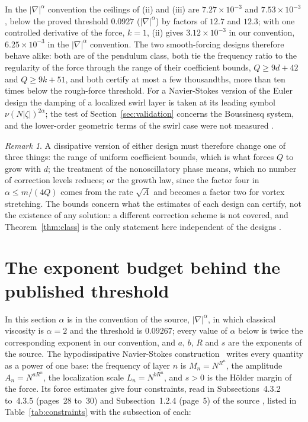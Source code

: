 \documentclass[11pt]{article}
\theoremstyle{remark}
\newtheorem{remark}[theorem]{Remark}
\newcommand{\ev}[1]{\hspace{0.2em}{\small\textsf{[#1]}}}
\begin{document}
In the $|\nabla|^{\alpha}$ convention the ceilings of (ii) and (iii) are $7.27\times10^{-3}$ and
$7.53\times10^{-3}$, below the proved threshold $0.0927$ ($|\nabla|^{\alpha}$)
by factors of $12.7$ and $12.3$; with one controlled derivative of the force, $k=1$, (ii) gives
$3.12\times10^{-3}$ in our convention, $6.25\times10^{-3}$ in the $|\nabla|^{\alpha}$ convention. The two smooth-forcing designs
therefore behave alike: both are of the pendulum class, both tie the frequency ratio to the
regularity of the force through the range of their coefficient bounds, $Q\ge9d+42$ and $Q\ge9k+51$,
and both certify at most a few thousandths, more than ten times below the rough-force threshold. For
a Navier-Stokes version of the Euler design the damping of a localized swirl layer is taken at its
leading symbol $\nu(N|\zeta|)^{2\alpha}$; the test of Section~\ref{sec:validation} concerns
the Boussinesq system, and the lower-order geometric terms of the swirl case were not measured \ev{U}.

\begin{remark}\label{rem:levers}
A dissipative version of either design must therefore change one of three things: the range of
uniform coefficient bounds, which is what forces $Q$ to grow with $d$; the treatment of the
nonoscillatory phase means, which no number of correction levels reduces; or the growth law, since
the factor four in $\alpha\le m/(4Q)$ comes from the rate $\sqrt A$ and becomes a factor two for
vortex stretching. The bounds concern what the estimates of each design can certify, not the
existence of any solution: a different correction scheme is not covered, and Theorem~\ref{thm:class}
is the only statement here independent of the designs \ev{D}.
\end{remark}

\section{The exponent budget behind the published threshold}\label{sec:budget}

In this section $\alpha$ is in the convention of the source, $|\nabla|^{\alpha}$, in which classical
viscosity is $\alpha=2$ and the threshold is $0.09267$; every value of $\alpha$ below is twice the
corresponding exponent in our convention, and $a$, $b$, $R$ and $s$ are the exponents of the source. The hypodissipative Navier-Stokes construction~\cite{cmz} writes every quantity as a power of one base: the
frequency of layer $n$ is $M_{n}=N^{R^{n}}$, the amplitude $A_{n}=N^{aR^{n}}$, the localization scale
$L_{n}=N^{bR^{n}}$, and $s>0$ is the H\"older margin of the force. Its force estimates give four
constraints, read in Subsections~4.3.2 to~4.3.5 (pages~28 to~30) and Subsection~1.2.4 (page~5) of the
source \ev{V}, listed in Table~\ref{tab:constraints} with the subsection of each:
\end{document}
